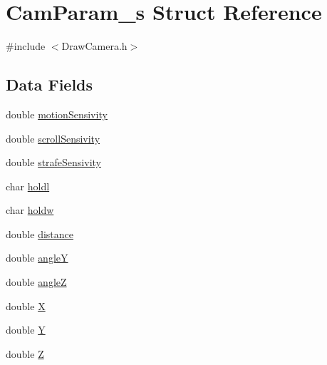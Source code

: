\hypertarget{struct_cam_param__s}{\section{Cam\-Param\-\_\-s Struct Reference}
\label{struct_cam_param__s}
}


{\ttfamily \#include $<$Draw\-Camera.\-h$>$}

\subsection*{Data Fields}
\begin{DoxyCompactItemize}
\item 
double \hyperlink{struct_cam_param__s_a7606bcd855caaae613b446c61ea6b678}{motion\-Sensivity}
\item 
double \hyperlink{struct_cam_param__s_aeef863ea6d36dc86ff3957e2239a2864}{scroll\-Sensivity}
\item 
double \hyperlink{struct_cam_param__s_a4d6c1cafa99e592232e53c0b6ce86577}{strafe\-Sensivity}
\item 
char \hyperlink{struct_cam_param__s_ac965ded914129a445aa425e14ce4e333}{holdl}
\item 
char \hyperlink{struct_cam_param__s_a647f1b6a32d4fdf31851f937ef20b03e}{holdw}
\item 
double \hyperlink{struct_cam_param__s_a79b8e036dca6911e3295a47d99f21f43}{distance}
\item 
double \hyperlink{struct_cam_param__s_a5f18c7186cd8bb18342e1294505fa63c}{angle\-Y}
\item 
double \hyperlink{struct_cam_param__s_aa834f0cff99511d8ba9b1c04bdea07eb}{angle\-Z}
\item 
double \hyperlink{struct_cam_param__s_a1059b82f84827fc49ea81b12566b3cdb}{X}
\item 
double \hyperlink{struct_cam_param__s_ac8d59bf77d5ef21e7c7a88b08f14c825}{Y}
\item 
double \hyperlink{struct_cam_param__s_a0f16a8f561453187897f0820186da39b}{Z}
\end{DoxyCompactItemize}


